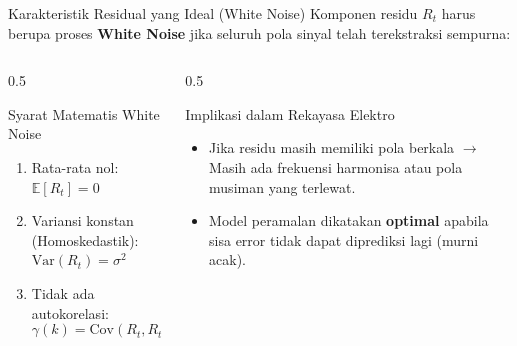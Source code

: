 \documentclass[aspectratio=169, 10pt]{beamer}
\begin{document}
\begin{frame}{Karakteristik Residual yang Ideal (White Noise)}
    Komponen residu $R_t$ harus berupa proses \textbf{White Noise} jika seluruh pola sinyal telah terekstraksi sempurna:
    
    \begin{columns}[T]
        \begin{column}{0.5\textwidth}
            \begin{block}{Syarat Matematis White Noise}
                \begin{enumerate}
                    \item Rata-rata nol: $\mathbb{E}[R_t] = 0$
                    \item Variansi konstan (Homoskedastik): $\mathrm{Var}(R_t) = \sigma^2$
                    \item Tidak ada autokorelasi: 
                    \begin{equation}
                        \gamma(k) = \mathrm{Cov}(R_t, R_{t-k}) = 0 \quad (\forall k \neq 0)
                    \end{equation}
                \end{enumerate}
            \end{block}
        \end{column}
        \begin{column}{0.5\textwidth}
            \begin{alertblock}{Implikasi dalam Rekayasa Elektro}
                \begin{itemize}
                    \item Jika residu masih memiliki pola berkala $\rightarrow$ Masih ada frekuensi harmonisa atau pola musiman yang terlewat.
                    \item Model peramalan dikatakan \textbf{optimal} apabila sisa error tidak dapat diprediksi lagi (murni acak).
                \end{itemize}
            \end{alertblock}
        \end{column}
    \end{columns}
\end{frame}
\end{document}
